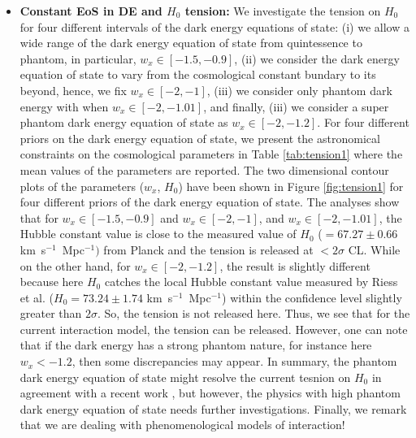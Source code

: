 \documentclass[superscriptaddress,oneolumn,secnumarabic,
amssymb,amsmath,nobibnotes,aps,prd,showpacs,nofootinbib]{revtex4}%
\begin{document}
\begin{itemize}

\item \textbf{Constant EoS in DE and $H_0$ tension:} We investigate the tension on
$H_0$ for four different intervals of the dark energy equations of state: (i) we allow a wide range of the dark energy equation of state from quintessence to phantom, in particular, $w_x \in [-1.5, -0.9]$, (ii) we consider the dark energy equation of state to vary from the cosmological constant bundary to its beyond, hence, we fix $w_x \in [-2, -1]$,  (iii) we consider only phantom dark energy with
when $w_x \in [-2, -1.01]$, and finally, (iii) we consider a super phantom dark energy equation of state as $w_x \in [-2, -1.2]$. For four different priors on the dark energy equation of state, we present the astronomical constraints on the cosmological parameters in Table \ref{tab:tension1} where the mean values of the parameters are reported. The two dimensional contour plots of the parameters ($w_x$, $H_0$) have been shown in Figure \ref{fig:tension1} for  four different priors of the dark energy equation of state. The analyses show that for $w_x \in [-1.5,-0.9]$ and $w_x \in [-2, -1]$, and $w_x \in [-2, -1.01]$, the Hubble constant value is close to the measured value of $H_0$ ($= 67.27 \pm 0.66$ km~s$^{-1}$~Mpc$^{-1})$ from Planck \cite{Ade:2015xua} and the tension is released at $< 2 \sigma$ CL. While on the other hand, for $w_x \in [-2, -1.2]$, the result is slightly different because here $H_0$ catches the local Hubble constant value measured by Riess et al. ($H_0 = 73.24 \pm 1.74$ km~s$^{-1}$~Mpc$^{-1}$) \cite{Riess:2016jrr} within the confidence level slightly greater than $2\sigma$. So, the tension is not released here. Thus, we see that for the current interaction model, the tension can be released. However, one can note that if the dark energy has a strong phantom nature, for instance here $w_x < -1.2$, then some discrepancies may appear. In summary, the phantom dark energy equation of state might resolve the current tesnion on $H_0$ in agreement with a recent work \cite{DiValentino:2017iww}, but however, the physics with high phantom dark energy equation of state needs further investigations. Finally, we remark that we are dealing with phenomenological models of interaction!


\end{itemize}
\end{document}
